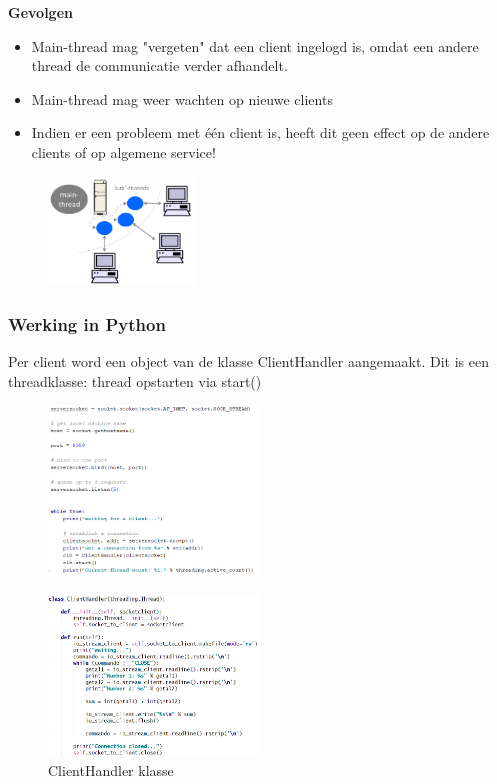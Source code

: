 \documentclass{article}
\begin{document}
\textbf{Gevolgen}

\begin{itemize}
    \item Main-thread mag "vergeten" dat een client ingelogd is, omdat een andere thread de communicatie verder afhandelt.
    \item Main-thread mag weer wachten op nieuwe clients
    \item Indien er een probleem met één client is, heeft dit geen effect op de andere clients of op algemene service!
\end{itemize}

\begin{figure}[H]
    \centering
    \includegraphics[width=0.35\textwidth]{multithreaded-server2.png}
\end{figure}

\subsubsection{Werking in Python}

Per client word een object van de klasse ClientHandler aangemaakt. 
Dit is een threadklasse: thread opstarten via start()

\begin{figure}[H]
    \centering
    \includegraphics[width=0.5\textwidth]{multithreaded-server-python.png}
\end{figure}

\begin{figure}[H]
    \centering
    \includegraphics[width=0.5\textwidth]{multithreaded-server-python2.png}
    \caption{ClientHandler klasse}
\end{figure}
\end{document}
